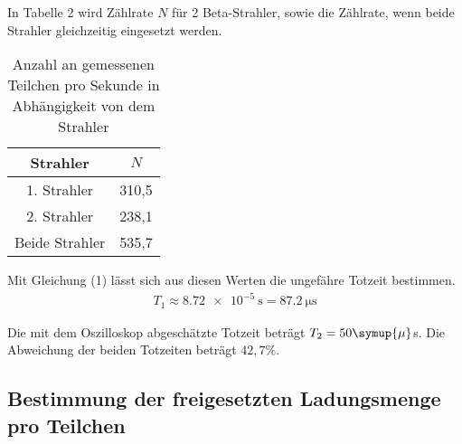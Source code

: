 In Tabelle 2 wird Zählrate $N$ für 2 Beta-Strahler, sowie die Zählrate, wenn beide Strahler gleichzeitig
eingesetzt werden.

\begin{table}[H]
  \centering
  \caption{Anzahl an gemessenen Teilchen pro Sekunde in Abhängigkeit von dem Strahler}
  \label{tab:Rechteckspannung}
  \begin{tabular}{c c}
    \toprule
    Strahler & $N$  \\
    \midrule
    1. Strahler & 310,5 \\
    2. Strahler & 238,1\\
    Beide Strahler & 535,7 \\
    \bottomrule
  \end{tabular}
\end{table}

Mit Gleichung (1) lässt sich aus diesen Werten die ungefähre Totzeit bestimmen.
\begin{align*}
  T_1 \approx \SI{8.72e-5}{\second} = \SI{87,2}{\micro\second}
\end{align*}

Die mit dem Oszilloskop abgeschätzte Totzeit beträgt $T_2 = 50 \symup{\mu}$s.
Die Abweichung der beiden Totzeiten beträgt $42,7 \%$.


\subsection{Bestimmung der freigesetzten Ladungsmenge pro Teilchen}
